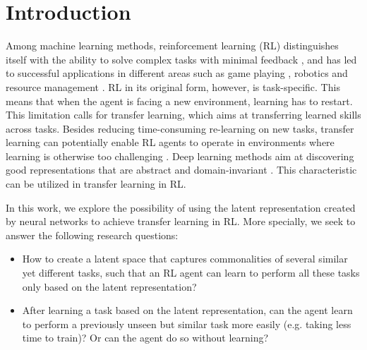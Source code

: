 \section{Introduction}
\label{sec:introduction}
Among machine learning methods, reinforcement learning (RL) distinguishes itself with the ability to solve complex tasks with minimal feedback \citep{taylor2007cross}, and has led to successful applications 
in different areas such as game playing \citep{silver2016mastering}, robotics \citep{levine2016end} and resource management \citep{mao2016resource}. 
RL in its original form, however, is task-specific.
This means that when the agent is facing a new environment, learning has to restart.
This limitation calls for transfer learning, which aims at transferring learned skills across tasks.
Besides reducing time-consuming re-learning on new tasks, transfer learning can potentially enable RL agents to operate in environments where learning is otherwise too challenging \citep{barreto2018transfer}.
Deep learning methods aim at discovering good representations that are abstract and domain-invariant \citep{bengio2012deep,ganin2014unsupervised}.
This characteristic can be utilized in transfer learning in RL.

In this work, we explore the possibility of using the latent representation created by neural networks to achieve transfer learning in RL.
More specially, we seek to answer the following research questions:
\begin{itemize}
	\item How to create a latent space that captures commonalities of several similar yet different tasks, such that an RL agent can learn to perform all these tasks only based on the latent representation?
	\item After learning a task based on the latent representation, can the agent learn to perform a previously unseen but similar task more easily (e.g. taking less time to train)? Or can the agent do so without learning?
\end{itemize}






